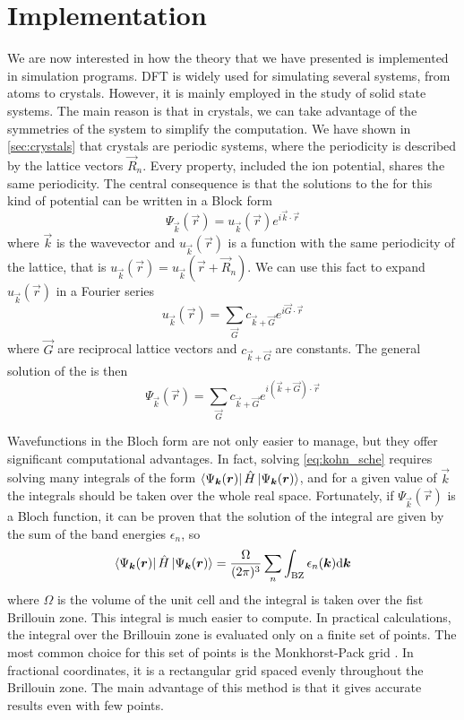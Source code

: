\section{Implementation} \label{sec:implementation}
We are now interested in how the theory that we have presented is implemented in simulation programs. DFT is widely used for simulating several systems, from atoms to crystals. However, it is mainly employed in the study of solid state systems. The main reason is that in crystals, we can take advantage of the symmetries of the system to simplify the computation. We have shown in \cref{sec:crystals} that crystals are periodic systems, where the periodicity is described by the lattice vectors $\vec{R}_n$. Every property, included the ion potential, shares the same periodicity. The central consequence is that the solutions to the \sche for this kind of potential can be written in a Block form
\begin{equation}
    \Psi_{\vec{k}}(\vec{r}) = u_{\vec{k}}(\vec{r}) e^{i\vec{k}\cdot\vec{r}}
\end{equation}
where $\vec{k}$ is the wavevector and $u_{\vec{k}}(\vec{r})$ is a function with the same periodicity of the lattice, that is $u_{\vec{k}}(\vec{r}) = u_{\vec{k}}(\vec{r}+\vec{R}_n)$. We can use this fact to expand $u_{\vec{k}}(\vec{r})$ in a Fourier series
\begin{equation}
    u_{\vec{k}}(\vec{r}) = \sum_\vec{G} c_{\vec{k}+\vec{G}} e^{i\vec{G}\cdot\vec{r}}
\end{equation}
where $\vec{G}$ are reciprocal lattice vectors and $c_{\vec{k}+\vec{G}}$ are constants. The general solution of the \sche is then
\begin{equation} \label{eq:sum_bloch}
    \Psi_{\vec{k}}(\vec{r}) = \sum_\vec{G} c_{\vec{k}+\vec{G}} e^{i(\vec{k}+\vec{G})\cdot\vec{r}}
\end{equation}

Wavefunctions in the Bloch form are not only easier to manage, but they offer significant computational advantages. In fact, solving \cref{eq:kohn_sche} requires solving many integrals of the form $\bra{\Psi_{\mathbf{\boldsymbol{k}}}(\mathbf{\boldsymbol{r}})} \hat{H} \ket{\Psi_{\mathbf{\boldsymbol{k}}}(\mathbf{\boldsymbol{r}})}$, and for a given value of $\vec{k}$ the integrals should be taken over the whole real space. Fortunately, if $\Psi_{\vec{k}}(\vec{r})$ is a Bloch function, it can be proven that the solution of the integral are given by the sum of the band energies $\epsilon_n$, so
\begin{equation}
    \bra{\Psi_{\vec{k}}(\vec{r})} \oper{H} \ket{\Psi_{\vec{k}}(\vec{r})} = \frac{\Omega}{(2\pi)^3} \sum_n \int_\text{BZ} \epsilon_n(\vec{k})\differential \vec{k}
\end{equation}
where $\Omega$ is the volume of the unit cell and the integral is taken over the fist Brillouin zone. This integral is much easier to compute. In practical calculations, the integral over the Brillouin zone is evaluated only on a finite set of points. The most common choice for this set of points is the Monkhorst-Pack grid \cite{monkhorst1976}. In fractional coordinates, it is a rectangular grid spaced evenly throughout the Brillouin zone. The main advantage of this method is that it gives accurate results even with few points.

